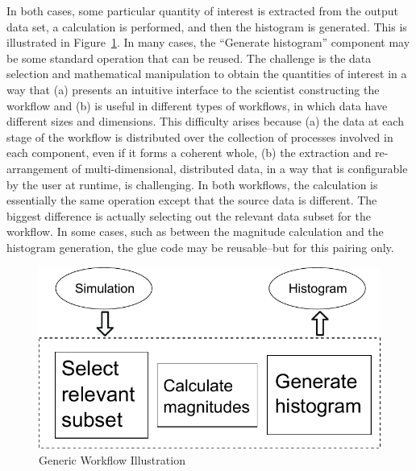 \documentclass[conference]{IEEEtran}
\begin{document}
In both cases, some particular quantity of interest is extracted from the
output data set, a calculation is performed, and then the histogram is
generated. This is illustrated in Figure~\ref{fig:generic-workflow}. In many
cases, the ``Generate histogram'' component may be some standard operation that
can be reused. The challenge is the data selection and mathematical
manipulation to obtain the quantities of interest in a way that (a) presents
an intuitive interface to the scientist constructing the workflow and (b) is useful in different
types of workflows, in which data have different sizes and dimensions.
This difficulty arises because (a) the data at each stage of the workflow
is distributed over the collection of processes
involved in each component, even if it forms a coherent whole, (b)
the extraction and re-arrangement of multi-dimensional, distributed data,
in a way that is configurable by the user at runtime, is challenging.
In both workflows, the calculation is essentially the same operation except
that the source data is different. The biggest difference is actually selecting out the relevant data
subset for the workflow. In some cases, such as between the magnitude
calculation and the histogram generation, the glue code may be reusable--but
for this pairing only.

\begin{figure}[htbp]
\centering
\includegraphics[width=\columnwidth]{fig/gwflow}
\caption{Generic Workflow Illustration}
\label{fig:generic-workflow}
\end{figure}
\end{document}
